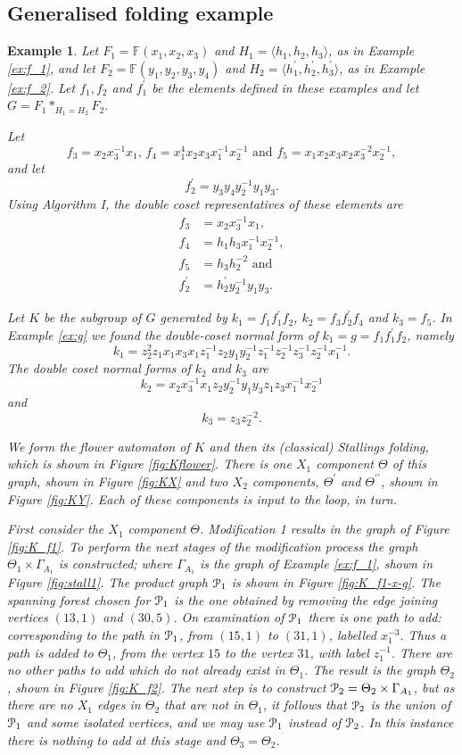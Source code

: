 \documentclass[a4paper,12pt]{article}
\newcommand{\G}{\Gamma }
\newcommand{\T}{\Theta }
\newcommand{\cP}{{\cal{P}}}
\newtheorem{exam}[theorem]{Example}
\newenvironment{example}{\begin{exam} \rm}{\end{exam}}
\numberwithin{equation}{section}
\numberwithin{figure}{section}
\newcommand{\FF}{\ensuremath{\mathbb{F}}}
\newcommand{\la}{\langle}
\newcommand{\ra}{\rangle}
\begin{document}
\subsection{Generalised folding example}
\begin{example}\label{ex:K}
Let $F_1=\FF(x_1,x_2,x_3)$ and $H_1=\la h_1,h_2,h_3\ra$,
as in Example \ref{ex:f_1}, and let $F_2=\FF(y_1,y_2,y_3,y_4)$ and
$H_2=\la h_1^\prime, h_2^\prime, h_3^\prime\ra$, as in Example \ref{ex:f_2}.
Let $f_1,f_2$ and $f_1^\prime$ be the elements defined in these examples
 and let $G=F_1\ast_{H_1=H_2} F_2$.

Let
\[f_3=x_2x_3^{-1}x_1,\, f_4= x_1^4 x_2 x_3 x_1^{-1} x_2^{-1}
\textrm{ and } f_5=x_1x_2x_3x_2x_3^{-2}x_2^{-1},\]
and let
\[ f_2^\prime =y_3y_4y_2^{-1}y_1y_3.\]
Using Algorithm I, the double coset representatives of these elements are
\begin{align*}
f_3 & = x_2x_3^{-1}x_1,\\
f_4 &= h_1h_3 x_1^{-1}x_2^{-1},\\
f_5 &= h_3h_2^{-2}\textrm{ and }\\
f_2^\prime &= h_2^\prime y_2^{-1}y_1y_3.
\end{align*}

Let $K$ be the subgroup of $G$ generated by $k_1=f_1f_1^\prime f_2$,
$k_2= f_3f_2^\prime f_4$ and $k_3=f_5$.
In Example \ref{ex:g} we found the double-coset normal form of
$k_1=g=f_1f_1^\prime f_2$, namely
\[k_1=z_2^2 z_1  x_1 x_3 x_1 z_1^{-1}
z_2y_1y_2^{-1} z_1^{-1}z_2^{-1}
z_3^{-1}z_2^{-1} x_1^{-1}.\]
The double coset normal forms of $k_2$ and $k_3$ are
\[k_2=  x_2x_3^{-1}x_1  z_2 y_2^{-1}y_1y_3 z_1z_3 x_1^{-1}x_2^{-1}\]
and
\[k_3 = z_3z_2^{-2}.\]

We form the flower automaton of $K$ and then its (classical) Stallings folding,
which is
shown in Figure \ref{fig:Kflower}.
There is one $X_1$ component $\Theta$ of this graph, shown in Figure \ref{fig:KX}
and two $X_2$ components, $\Theta^\prime$ and $\Theta^{\prime\prime}$, shown in Figure \ref{fig:KY}. Each of these components is input to the loop, in turn.

First consider the $X_1$ component $\Theta$. Modification 1
results in the graph of Figure \ref{fig:K_f1}. To perform the next
stages of the  modification process the graph $\Theta_1 \times
\G_{A_1}$ is constructed; where $\G_{A_1}$ is the graph of Example
\ref{ex:f_1}, shown in Figure \ref{fig:stall1}. The product graph
$\cP_1$ is shown in Figure \ref{fig:K_f1-x-g}. The spanning forest
chosen for $\cP_1$ is the one obtained by removing the edge
joining vertices $(13,1)$ and $(30,5)$. On examination of $\cP_1$
there is one path to add: corresponding to the path in $\cP_1$,
from $(15,1)$ to $(31,1)$, labelled $x_1^{-3}$. Thus a path is
added to $\T_1$, from the vertex $15$ to the vertex $31$, with
label $z_1^{-1}$. There are no other paths to add which do not
already exist in $\T_1$. The result is  the graph $\Theta_2$,
shown in Figure \ref{fig:K_f2}. The next step is to construct
$\cP_2=\T_2\times \G_{A_1}$, but as there are no $X_1$ edges in
$\T_2$ that are not in $\T_1$, it follows that  $\cP_2$ is the
union of $\cP_1$ and some isolated vertices, and we may use
$\cP_1$ instead of $\cP_2$. In this instance there is nothing to
add at this stage and $\T_3=\T_2$.


\end{example}
\end{document}
